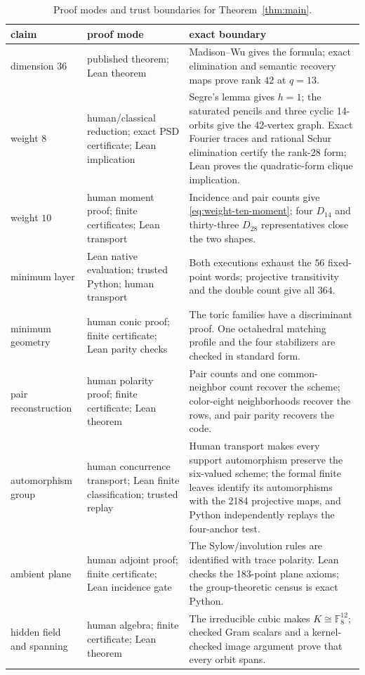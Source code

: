 \documentclass[11pt]{article}
\theoremstyle{definition}
\theoremstyle{remark}
\newcommand{\F}{\mathbb F}
\begin{document}
\clearpage
\begin{table}[!ht]
\centering
\footnotesize
\begin{tabular}{@{}>{\raggedright\arraybackslash}p{}
  >{\raggedright\arraybackslash}p{}
  >{\raggedright\arraybackslash}p{}@{}}
\toprule
claim & proof mode & exact boundary\\
\midrule
dimension \(36\)
& published theorem; Lean theorem
& Madison--Wu gives the formula; exact elimination and semantic recovery maps
  prove rank \(42\) at \(q=13\).\\
weight \(8\)
& human/classical reduction; exact PSD certificate; Lean implication
& Segre's lemma gives \(h=1\); the saturated pencils and three cyclic
  14-orbits give the 42-vertex graph.  Exact Fourier traces and rational
  Schur elimination certify the rank-28 form; Lean proves the quadratic-form
  clique implication.\\
weight \(10\)
& human moment proof; finite certificates; Lean transport
& Incidence and pair counts give \eqref{eq:weight-ten-moment}; four
  \(D_{14}\) and thirty-three \(D_{28}\) representatives close the two
  shapes.\\
minimum layer
& Lean native evaluation; trusted Python; human transport
& Both executions exhaust the \(56\) fixed-point words; projective
  transitivity and the double count give all \(364\).\\
minimum geometry
& human conic proof; finite certificate; Lean parity checks
& The toric families have a discriminant proof.  One octahedral matching
  profile and the four stabilizers are checked in standard form.\\
pair reconstruction
& human polarity proof; finite certificate; Lean theorem
& Pair counts and one common-neighbor count recover the scheme; color-eight
  neighborhoods recover the rows, and pair parity recovers the code.\\
automorphism group
& human concurrence transport; Lean finite classification; trusted replay
& Human transport makes every support automorphism preserve the six-valued
  scheme; the formal finite leaves identify its automorphisms with the 2184
  projective maps, and Python independently replays the four-anchor test.\\
ambient plane
& human adjoint proof; finite certificate; Lean incidence gate
& The Sylow/involution rules are identified with trace polarity.  Lean checks
  the 183-point plane axioms; the group-theoretic census is exact Python.\\
hidden field and spanning
& human algebra; finite certificate; Lean theorem
& The irreducible cubic makes \(K\cong\F_8^{12}\); checked Gram scalars and a
  kernel-checked image argument prove that every orbit spans.\\
\bottomrule
\end{tabular}
\caption{Proof modes and trust boundaries for Theorem~\ref{thm:main}.}
\label{tab:trust}
\end{table}
\end{document}
